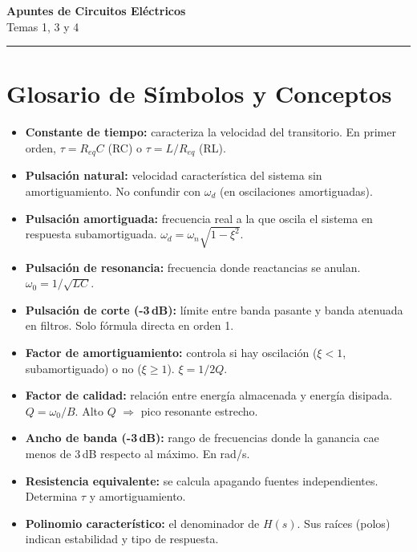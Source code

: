 \documentclass[12pt,a4paper]{article}
\begin{document}
\begin{center}
  {\huge\bfseries\color{mainblue} Apuntes de Circuitos Eléctricos}\\[0.4em]
  {\large\color{gray} Temas 1, 3 y 4}\\[0.3em]
  \color{rulegray}\rule{0.6\linewidth}{1pt}
\end{center}
\vspace{1em}

\section*{Glosario de Símbolos y Conceptos}

\begin{itemize}[leftmargin=2em, itemsep=3pt, parsep=0pt]
  \item[$\tau$] \textbf{Constante de tiempo:} caracteriza la velocidad del transitorio. En primer orden, $\tau = R_{eq}C$ (RC) o $\tau = L/R_{eq}$ (RL).
  \item[$\omega_n$] \textbf{Pulsación natural:} velocidad característica del sistema sin amortiguamiento. No confundir con $\omega_d$ (en oscilaciones amortiguadas).
  \item[$\omega_d$] \textbf{Pulsación amortiguada:} frecuencia real a la que oscila el sistema en respuesta subamortiguada. $\omega_d = \omega_n\sqrt{1-\xi^2}$.
  \item[$\omega_0$] \textbf{Pulsación de resonancia:} frecuencia donde reactancias se anulan. $\omega_0 = 1/\sqrt{LC}$.
  \item[$\omega_c$] \textbf{Pulsación de corte (-3\,dB):} límite entre banda pasante y banda atenuada en filtros. Solo fórmula directa en orden 1.
  \item[$\xi$] \textbf{Factor de amortiguamiento:} controla si hay oscilación ($\xi < 1$, subamortiguado) o no ($\xi \geq 1$). $\xi = 1/2Q$.
  \item[$Q$] \textbf{Factor de calidad:} relación entre energía almacenada y energía disipada. $Q = \omega_0/B$. Alto $Q$ $\Rightarrow$ pico resonante estrecho.
  \item[$B$] \textbf{Ancho de banda (-3\,dB):} rango de frecuencias donde la ganancia cae menos de 3\,dB respecto al máximo. En rad/s.
  \item[$R_{eq}$] \textbf{Resistencia equivalente:} se calcula apagando fuentes independientes. Determina $\tau$ y amortiguamiento.
  \item[\textbf{Pol. Caract.}] \textbf{Polinomio característico:} el denominador de $H(s)$. Sus raíces (polos) indican estabilidad y tipo de respuesta.

\end{itemize}
\end{document}
